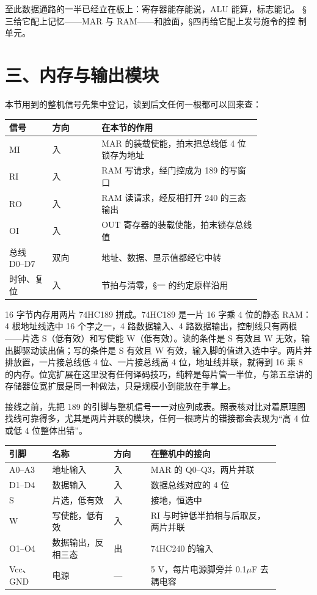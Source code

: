至此数据通路的一半已经立在板上：寄存器能存能说，ALU 能算，标志能记。
§三给它配上记忆——MAR 与 RAM——和脸面，§四再给它配上发号施令的控
制单元。

\section{三、内存与输出模块}

本节用到的整机信号先集中登记，读到后文任何一根都可以回来查：

\begin{longtable}{L{0.14\linewidth}L{0.16\linewidth}L{0.52\linewidth}}
\toprule
信号 & 方向 & 在本节的作用 \\
\midrule
MI & 入 & MAR 的装载使能，拍末把总线低 4 位锁存为地址 \\
RI & 入 & RAM 写请求，经门控成为 189 的写窗口 \\
RO & 入 & RAM 读请求，经反相打开 240 的三态输出 \\
OI & 入 & OUT 寄存器的装载使能，拍末锁存总线值 \\
总线 D0–D7 & 双向 & 地址、数据、显示值都经它中转 \\
时钟、复位 & 入 & 节拍与清零，§一 的约定原样沿用 \\
\bottomrule
\end{longtable}

16 字节内存用两片 74HC189 拼成。74HC189 是一片 16 字乘 4 位的静态 RAM：4 根地址线选中 16 个字之一，4 路数据输入、4 路数据输出，控制线只有两根——片选 S（低有效）和写使能 W（低有效）。读的条件是 S 有效且 W 无效，输出脚驱动读出值；写的条件是 S 有效且 W 有效，输入脚的值进入选中字。两片并排放置，一片接总线低 4 位、一片接总线高 4 位，地址线并联，就得到 16 乘 8 的内存。位宽扩展在这里没有任何译码技巧，纯粹是每片管一半位，与第五章讲的存储器位宽扩展是同一种做法，只是规模小到能放在手掌上。

接线之前，先把 189 的引脚与整机信号一一对应列成表。照表核对比对着原理图找线可靠得多，尤其是两片并联的模块，任何一根跨片的错接都会表现为“高 4 位或低 4 位整体出错”。

\begin{longtable}{L{0.14\linewidth}L{0.20\linewidth}L{0.12\linewidth}L{0.42\linewidth}}
\toprule
引脚 & 名称 & 方向 & 在整机中的接向 \\
\midrule
A0–A3 & 地址输入 & 入 & MAR 的 Q0–Q3，两片并联 \\
D1–D4 & 数据输入 & 入 & 数据总线对应的 4 位 \\
S & 片选，低有效 & 入 & 接地，恒选中 \\
W & 写使能，低有效 & 入 & RI 与时钟低半拍相与后取反，两片并联 \\
O1–O4 & 数据输出，反相三态 & 出 & 74HC240 的输入 \\
Vcc、GND & 电源 & — & 5 V，每片电源脚旁并 0.1$\mu$F 去耦电容 \\
\bottomrule
\end{longtable}

